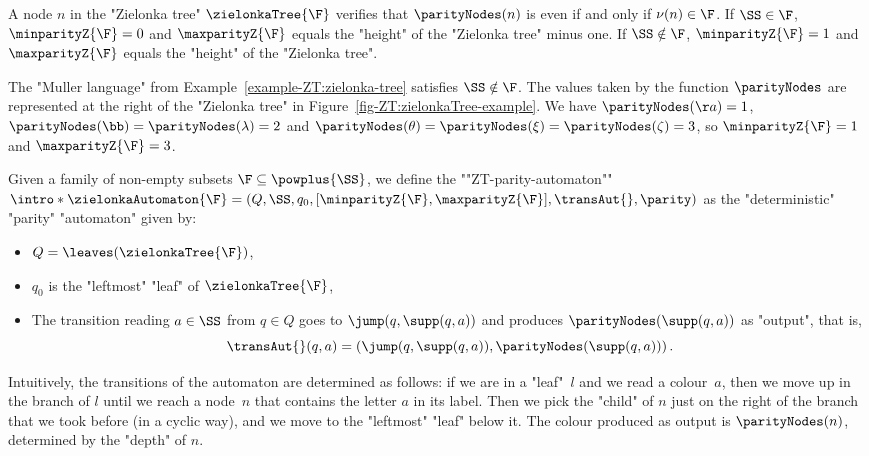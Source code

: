 \documentclass{theoretics}
\begin{document}
\begin{remark}\label{rmk:parity_levels_ZT}
	A node $n$ in the "Zielonka tree" $\zielonkaTree{\F}$ verifies that $\parityNodes(n)$ is even if and only if $\nu(n)\in \F$.
	If $\SS\in \F$, $\minparityZ{\F} = 0$ and $\maxparityZ{\F}$ equals the "height" of the "Zielonka tree" minus one. If $\SS\notin \F$, $\minparityZ{\F} = 1$ and $\maxparityZ{\F}$ equals the "height" of the "Zielonka tree". 
\end{remark}

\begin{example}
	The "Muller language" from Example~\ref{example-ZT:zielonka-tree} satisfies $\SS\notin \F$. The values taken by the function $\parityNodes$ are represented at the right of the "Zielonka tree" in Figure~\ref{fig-ZT:zielonkaTree-example}. We have $\parityNodes(\aa)=1$, $\parityNodes(\bb)=\parityNodes(\lambda) = 2$ and $\parityNodes(\theta) = \parityNodes(\xi) = \parityNodes(\zeta) = 3$, so $\minparityZ{\F}=1$ and $\maxparityZ{\F}=3$.
\end{example}



\begin{definition}\label{def-ZT:parityAutomatonZT}
	\AP Given a family of non-empty subsets $\F\subseteq \powplus{\SS}$,
	we define the  ""ZT-parity-automaton"" $\intro*\zielonkaAutomaton{\F}=(Q, \SS, q_0, [\minparityZ{\F}, \maxparityZ{\F}], \transAut{}, \parity)$ as the "deterministic" "parity" "automaton" given by:
	\begin{itemize}
		\item $Q=\leaves(\zielonkaTree{\F})$, 
		\item $q_0$ is the "leftmost" "leaf" of $\zielonkaTree{\F}$,\footnotemark{}
		\item The transition reading $a\in\SS$ from $q\in Q$ goes to $\jump(q,\supp(q,a))$  and produces $\parityNodes(\supp(q,a))$ as "output", that is, \[\transAut{}(q,a) = \left(\jump(q,\supp(q,a)), \parityNodes(\supp(q,a))\right).\]
	\end{itemize}
\end{definition}



Intuitively, the transitions of the automaton are determined as follows: if we are in a "leaf"~$l$ and we read a colour~$a$, then we move up in the branch of $l$ until we reach a node~$n$ that contains the letter $a$ in its label. 
Then we pick the "child" of $n$ just on the right of the branch that we took before (in a cyclic way), and we move to the "leftmost" "leaf" below it. The colour produced as output is $\parityNodes(n)$, determined by the "depth" of $n$.
\end{document}
